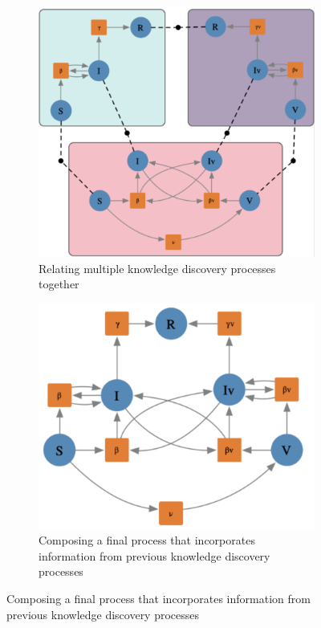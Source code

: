 \documentclass[11pt]{extarticle}
\begin{document}
\begin{figure}[!h]
 \begin{subfigure}{0.4\textwidth}
     \includegraphics[width=\textwidth]{sub_models}
     \caption{Relating multiple knowledge discovery processes together}
     \label{fig:a}
 \end{subfigure}
 \hfill
 \begin{subfigure}{0.4\textwidth}
     \includegraphics[width=\textwidth]{composed_model}
     \caption{Composing a final process that incorporates information from previous knowledge discovery processes}
     \label{fig:b}
 \end{subfigure}
 \label{Label}

\end{figure}
\end{document}
